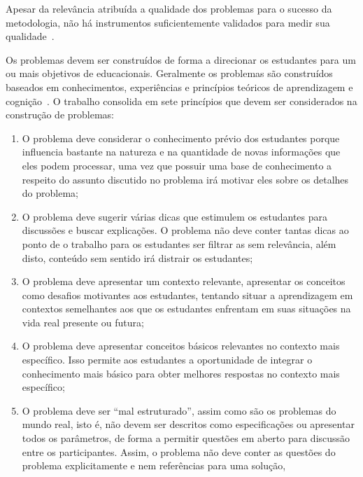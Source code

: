 Apesar da relevância atribuída a qualidade dos problemas para o
sucesso da metodologia, não há instrumentos suficientemente
validados para medir sua
qualidade~\cite{des1999delphi,sockalingam2012assessing}.

Os problemas devem ser construídos de forma a
direcionar os estudantes
para um ou mais objetivos de educacionais.
Geralmente os problemas são construídos baseados em conhecimentos,
experiências e princípios teóricos de aprendizagem e
cognição~\cite{des1999delphi,dolmans1997seven}.
O trabalho \cite{dolmans1997seven} consolida em sete
princípios que devem ser considerados na construção
de problemas:

\begin{enumerate}
\item{O problema deve considerar o conhecimento
prévio dos estudantes porque influencia bastante na
natureza e na quantidade de novas informações que
eles podem processar, uma vez que possuir
uma base de conhecimento a respeito do assunto
discutido no problema irá motivar eles sobre os
detalhes do problema;}
\item{O problema deve sugerir várias dicas
que estimulem os estudantes para discussões
e buscar explicações. O problema não deve
conter tantas dicas ao ponto de o trabalho
para os estudantes ser filtrar as sem relevância,
além disto, conteúdo sem sentido irá distrair
os estudantes;}
\item{O problema deve apresentar um contexto relevante,
apresentar os conceitos como desafios motivantes aos
estudantes, tentando situar a aprendizagem em contextos
semelhantes aos que os estudantes enfrentam em suas
situações na vida real presente ou futura;}
\item{O problema deve apresentar conceitos básicos
relevantes no contexto mais específico.
Isso permite aos estudantes a oportunidade
de integrar o conhecimento mais básico para obter melhores
respostas no contexto mais específico;}
\item{O problema deve ser ``mal estruturado'', assim como
são os problemas do mundo real, isto é, não
devem ser descritos como especificações ou apresentar
todos os parâmetros, de forma a permitir questões em
aberto para discussão entre os participantes.
Assim, o problema não deve conter as questões do problema
explicitamente e nem referências para uma solução,
}
\end{enumerate}
